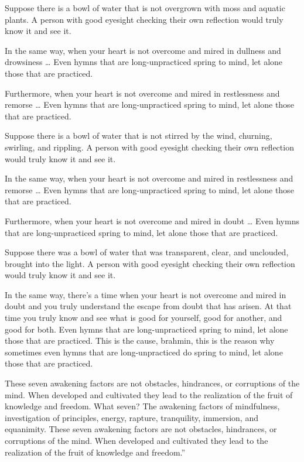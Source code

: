 \documentclass[12pt,openany]{book}%
\begin{document}
Suppose there is a bowl of water that is not overgrown with moss and aquatic plants. A person with good eyesight checking their own reflection would truly know it and see it. 

In the same way, when your heart is not overcome and mired in dullness and drowsiness … Even hymns that are long-unpracticed spring to mind, let alone those that are practiced. 

Furthermore, when your heart is not overcome and mired in restlessness and remorse … Even hymns that are long-unpracticed spring to mind, let alone those that are practiced. 

Suppose there is a bowl of water that is not stirred by the wind, churning, swirling, and rippling. A person with good eyesight checking their own reflection would truly know it and see it. 

In the same way, when your heart is not overcome and mired in restlessness and remorse … Even hymns that are long-unpracticed spring to mind, let alone those that are practiced. 

Furthermore, when your heart is not overcome and mired in doubt … Even hymns that are long-unpracticed spring to mind, let alone those that are practiced. 

Suppose there was a bowl of water that was transparent, clear, and unclouded, brought into the light. A person with good eyesight checking their own reflection would truly know it and see it. 

In the same way, there’s a time when your heart is not overcome and mired in doubt and you truly understand the escape from doubt that has arisen. At that time you truly know and see what is good for yourself, good for another, and good for both. Even hymns that are long-unpracticed spring to mind, let alone those that are practiced. This is the cause, brahmin, this is the reason why sometimes even hymns that are long-unpracticed do spring to mind, let alone those that are practiced. 

These seven awakening factors are not obstacles, hindrances, or corruptions of the mind. When developed and cultivated they lead to the realization of the fruit of knowledge and freedom. What seven? The awakening factors of mindfulness, investigation of principles, energy, rapture, tranquility, immersion, and equanimity. These seven awakening factors are not obstacles, hindrances, or corruptions of the mind. When developed and cultivated they lead to the realization of the fruit of knowledge and freedom.” 
\end{document}
